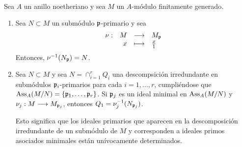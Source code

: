 \documentclass[../main.tex]{subfiles}
\begin{document}
\begin{theorem}
Sea $A$ un anillo noetheriano y sea $M$ un $A$-módulo finitamente generado.\begin{enumerate}
    \item Sea $N\subset M$ un submódulo $\mathfrak{p}$-primario y sea
    $$\begin{array}{rrcl}
	\nu:&M&\longrightarrow&M_{\mathfrak{p}}\\
	&x&\longmapsto&\frac{x}{1}\\ \end{array}$$ Entonces, $\nu^{-1}(N_{\mathfrak{p}})=N$.
	\item Sea $N\subset M$ y sea $N=\cap_{i=1}^rQ_i$ una descompsición irredundante en submódulos $\mathfrak{p}_i$-primarios para cada $i=1,\dots,r$, cumpliéndose que $\text{Ass}_A(M/N)=\{\mathfrak{p}_1,\dots,\mathfrak{p}_r\}$. Si $\mathfrak{p}_j$ es un ideal minimal en $\text{Ass}_A(M/N)$ y $\nu_j:M\longrightarrow M_{\mathfrak{p}_j}$, entonces $Q_1=\nu_j^{-1}(N_{\mathfrak{p}_j})$.

	Esto significa que los ideales primarios que aparecen en la descomposición irredundante de un submódulo de $M$ y corresponden a ideales primos asociados minimales están unívocamente determinados.
\end{enumerate}
\end{theorem}
\end{document}
